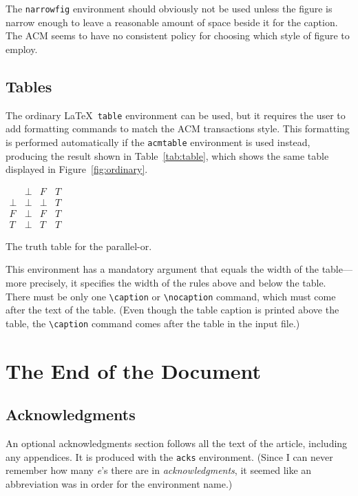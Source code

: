 The {\tt narrowfig} environment should obviously not be used unless the
figure is narrow enough to leave a reasonable amount of space beside it
for the caption.  The ACM seems to have no consistent policy for choosing
which style of figure to employ.

\subsection{Tables}

The ordinary \LaTeX\ {\tt table} environment can be used, but it
requires the user to add formatting commands to match the ACM
transactions style.  This formatting is performed automatically
if the {\tt acmtable} environment is used instead, producing
the result shown in Table~\ref{tab:table}, which shows the same
table displayed in Figure~\ref{fig:ordinary}.
\begin{acmtable}{100pt}
\centering
\(\begin{array}{c|ccc}
     & \bot & F & T \\
\hline
\bot & \bot & \bot & T \\
F    & \bot & F    & T \\
T    & \bot & T    & T
\end{array}\)
\caption{The truth table for the parallel-or.}
\label{tab:table}
\end{acmtable}
This environment has a mandatory argument that equals the width
of the table---more precisely, it specifies the width of the rules
above and below the table.  There must be only one 
\verb|\caption| or \verb|\nocaption|
command, which must come after the text of the table.  
(Even though the table caption is printed above the table, the
\verb|\caption| command comes after the table in the input file.)


\section{The End of the Document}

\subsection{Acknowledgments}

An optional acknowledgments section follows all the text of the
article, including any appendices.  It is produced with the
{\tt acks} environment.  (Since I can never remember how many
{\em e\/}'s there are in {\em acknowledgments}, it seemed
like an abbreviation was in order for the environment name.)


